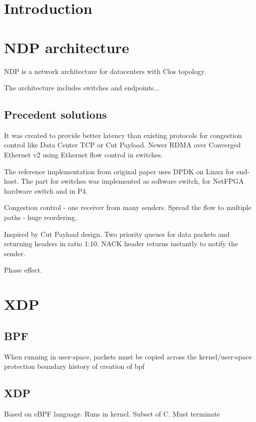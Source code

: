 \chapter{Introduction}


\chapter{NDP architecture}
NDP is a network architecture for datacenters with Clos topology.

The architecture includes switches and endpoints...

\section{Precedent solutions}
It was created to provide better latency than existing protocols for congestion control like Data Center TCP or Cut Payload.
Newer RDMA over Converged Ethernet v2 using Ethernet flow control in switches.

The reference implementation from original paper uses DPDK on Linux for end-host.
The part for switches was implemented as software switch, for NetFPGA hardware switch and in P4.

Congestion control - one receiver from many senders.
Spread the flow to multiple paths - huge reordering.

Inspired by Cut Payload design.
Two priority queues for data packets and returning headers in ratio 1:10.
NACK header returns instantly to notify the sender.

Phase effect.

\chapter{XDP}

\section{BPF}
When running in user-space, packets must be copied across the kernel/user-space protection boundary
history of creation of bpf

\section{XDP}
Based on eBPF language.
Runs in kernel.
Subset of C.
Must terminate

